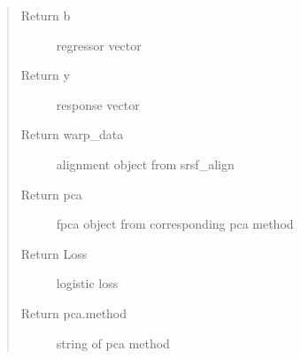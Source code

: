 \documentclass[letterpaper,10pt,english]{sphinxmanual}
\begin{document}
\begin{fulllineitems}
\begin{quote}
\begin{description}
\item[{Return b}] \leavevmode
regressor vector

\item[{Return y}] \leavevmode
response vector

\item[{Return warp\_data}] \leavevmode
alignment object from srsf\_align

\item[{Return pca}] \leavevmode
fpca object from corresponding pca method

\item[{Return Loss}] \leavevmode
logistic loss

\item[{Return pca.method}] \leavevmode
string of pca method

\end{description}\end{quote}

\end{fulllineitems}

\end{document}
